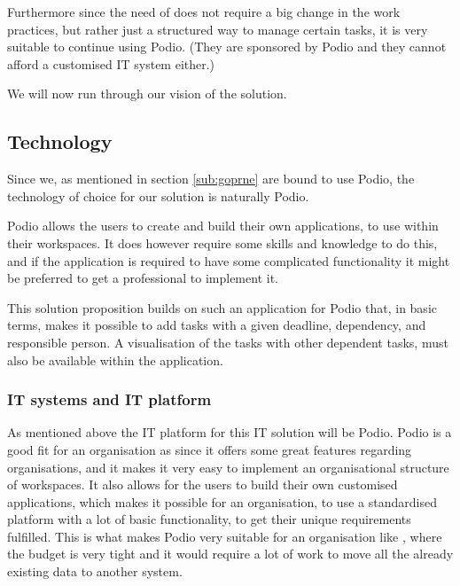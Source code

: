 Furthermore since the need of \mil does not require a big change in the work practices, but rather
just a structured way to manage certain tasks, it is very suitable to continue using Podio. (They
are sponsored by Podio and they cannot afford a customised IT system either.)

We will now run through our vision of the solution.

\subsection{Technology}
\label{sub:technology}
Since we, as mentioned in section \ref{sub:goprne} are bound to use Podio, the technology of choice
for our solution is naturally Podio. 

Podio allows the users to create and build their own applications, to use within their workspaces.
It does however require some skills and knowledge to do this, and if the application is required to
have some complicated functionality it might be preferred to get a professional to implement it.

This solution proposition builds on such an application for Podio that, in basic terms, makes it possible to add
tasks with a given deadline, dependency, and responsible person. A visualisation of the tasks with
other dependent tasks, must also be available within the application. 

\subsubsection{IT systems and IT platform}

As mentioned above the IT platform for this IT solution will be Podio. Podio is a good fit for an
organisation as \mil since it offers some great features regarding organisations, and it makes it
very easy to implement an organisational structure of workspaces. It also allows for the users to
build their own customised applications, which makes it possible for an organisation, to use a
standardised platform with a lot of basic functionality, to get their unique requirements fulfilled.
This is what makes Podio very suitable for an organisation like \milNO, where the budget is very
tight and it would require a lot of work to move all the already existing data to another system.

